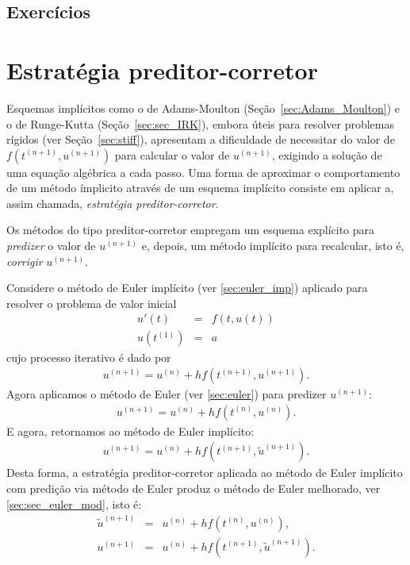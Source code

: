 \construirExeresol

\subsection*{Exercícios}

\construirExer

\section{Estratégia preditor-corretor}
Esquemas implícitos como o de Adams-Moulton (Seção~\ref{sec:Adams_Moulton}) e o de Runge-Kutta (Seção~\ref{sec:sec_IRK}), embora úteis para resolver problemas rígidos (ver Seção~\ref{sec:stiff}), apresentam a dificuldade de necessitar do valor de $f(t^{(n+1)},u^{(n+1)})$ para calcular o valor de $u^{(n+1)}$, exigindo a solução de uma equação algébrica a cada passo. Uma forma de aproximar o comportamento de um método ímplicito através de um esquema implícito consiste em aplicar a, assim chamada, \emph{estratégia preditor-corretor}.

Os métodos do tipo preditor-corretor empregam um esquema explícito para \emph{predizer} o valor de $u^{(n+1)}$ e, depois, um método implícito para recalcular, isto é, \emph{corrigir} $u^{(n+1)}$.

\begin{ex} Considere o método de Euler implícito (ver \ref{sec:euler_imp}) aplicado para resolver  o problema de valor inicial
\begin{eqnarray}
  u'(t)  &=& f(t,u(t)) \\
  u(t^{(1)}) &=& a
\end{eqnarray}
cujo processo iterativo é dado por
\begin{eqnarray}
u^{(n+1)}=u^{(n)} + h f(t^{(n+1)},u^{(n+1)}).
\end{eqnarray}
Agora aplicamos o método de Euler (ver \ref{sec:euler}) para predizer $u^{(n+1)}$:
\begin{eqnarray}
u^{(n+1)}=u^{(n)} + h f(t^{(n)},u^{(n)}).
\end{eqnarray}
E agora, retornamos ao método de Euler implícito:
\begin{eqnarray}
u^{(n+1)}=u^{(n)} + h f(t^{(n+1)},\tilde{u}^{(n+1)}).
\end{eqnarray}
Desta forma, a estratégia preditor-corretor aplicada ao método de Euler implícito com predição via método de Euler produz o método de Euler melhorado, ver \ref{sec:sec_euler_mod}, isto é:
\begin{eqnarray}
\tilde{u}^{(n+1)}&=&u^{(n)} + h f(t^{(n)},u^{(n)}),\\
u^{(n+1)}&=&u^{(n)} + h f(t^{(n+1)},\tilde{u}^{(n+1)}).
\end{eqnarray}
\end{ex}


